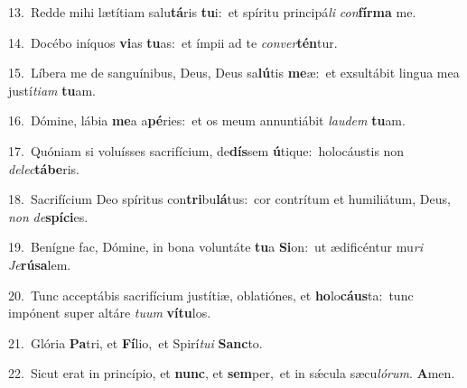 {\numbfont\textcolor{\numbcolor}{13.}}~Redde mihi lætítiam salu\-\textbf{tá}\-ris \textbf{tu}\-i:~\star et spíritu principá\textit{li} \textit{con}\-\textbf{fír}\textbf{ma} me.\par
{\numbfont\textcolor{\numbcolor}{14.}}~Docébo iníquos \textbf{vi}\-as \textbf{tu}\-as:~\star et ímpii ad te \textit{con}\-\textit{ver}\textbf{tén}tur.\par
{\numbfont\textcolor{\numbcolor}{15.}}~Líbera me de sanguínibus, Deus, Deus sa\-\textbf{lú}\-tis \textbf{me}\-æ:~\star et exsultábit lingua mea justí\-\textit{ti}\-\textit{am} \textbf{tu}\-am.\par
{\numbfont\textcolor{\numbcolor}{16.}}~Dómine, lábia \textbf{me}\-a a\-\textbf{pé}\-ries:~\star et os meum annuntiábit \textit{lau}\-\textit{dem} \textbf{tu}\-am.\par
{\numbfont\textcolor{\numbcolor}{17.}}~Quóniam si voluísses sacrifícium, de\-\textbf{dís}\-sem \textbf{ú}\-tique:~\star holocáustis non \textit{de}\-\textit{lec}\textbf{tá}\textbf{be}ris.\par
{\numbfont\textcolor{\numbcolor}{18.}}~Sacrifícium Deo spíritus con\-\textbf{tri}\-bu\-\textbf{lá}\-tus:~\star cor contrítum et humiliátum, Deus, \textit{non} \textit{de}\-\textbf{spí}\textbf{ci}es.\par
{\numbfont\textcolor{\numbcolor}{19.}}~Benígne fac, Dómine, in bona voluntáte \textbf{tu}\-a \textbf{Si}\-on:~\star ut ædificéntur mu\textit{ri} \textit{Je}\-\textbf{rú}\textbf{sa}lem.\par
{\numbfont\textcolor{\numbcolor}{20.}}~Tunc acceptábis sacrifícium justítiæ, oblatiónes, et \textbf{ho}\-lo\-\textbf{cáus}\-ta:~\star tunc impónent super altáre \textit{tu}\-\textit{um} \textbf{ví}\-\textbf{tu}los.\par
{\numbfont\textcolor{\numbcolor}{21.}}~Glória \textbf{Pa}\-tri, et \textbf{Fí}\-lio,~\star et Spirí\-\textit{tu}\-\textit{i} \textbf{Sanc}\-to.\par
{\numbfont\textcolor{\numbcolor}{22.}}~Sicut erat in princípio, et \textbf{nunc}\-, et \textbf{sem}\-per,~\star et in sǽcula sæcu\-\textit{ló}\-\textit{rum}. \textbf{A}\-men.\par

